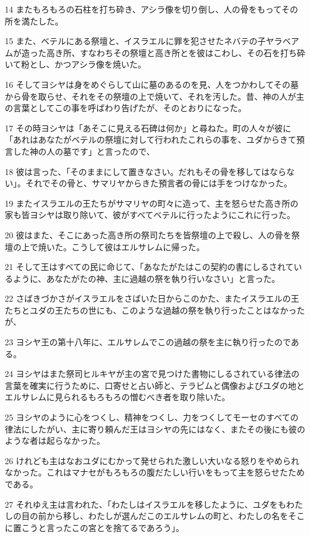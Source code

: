 \par 14 またもろもろの石柱を打ち砕き、アシラ像を切り倒し、人の骨をもってその所を満たした。
\par 15 また、ベテルにある祭壇と、イスラエルに罪を犯させたネバテの子ヤラベアムが造った高き所、すなわちその祭壇と高き所とを彼はこわし、その石を打ち砕いて粉とし、かつアシラ像を焼いた。
\par 16 そしてヨシヤは身をめぐらして山に墓のあるのを見、人をつかわしてその墓から骨を取らせ、それをその祭壇の上で焼いて、それを汚した。昔、神の人が主の言葉としてこの事を呼ばわり告げたが、そのとおりになった。
\par 17 その時ヨシヤは「あそこに見える石碑は何か」と尋ねた。町の人々が彼に「あれはあなたがベテルの祭壇に対して行われたこれらの事を、ユダからきて預言した神の人の墓です」と言ったので、
\par 18 彼は言った、「そのままにして置きなさい。だれもその骨を移してはならない」。それでその骨と、サマリヤからきた預言者の骨には手をつけなかった。
\par 19 またイスラエルの王たちがサマリヤの町々に造って、主を怒らせた高き所の家も皆ヨシヤは取り除いて、彼がすべてベテルに行ったようにこれに行った。
\par 20 彼はまた、そこにあった高き所の祭司たちを皆祭壇の上で殺し、人の骨を祭壇の上で焼いた。こうして彼はエルサレムに帰った。
\par 21 そして王はすべての民に命じて、「あなたがたはこの契約の書にしるされているように、あなたがたの神、主に過越の祭を執り行いなさい」と言った。
\par 22 さばきづかさがイスラエルをさばいた日からこのかた、またイスラエルの王たちとユダの王たちの世にも、このような過越の祭を執り行ったことはなかったが、
\par 23 ヨシヤ王の第十八年に、エルサレムでこの過越の祭を主に執り行ったのである。
\par 24 ヨシヤはまた祭司ヒルキヤが主の宮で見つけた書物にしるされている律法の言葉を確実に行うために、口寄せと占い師と、テラピムと偶像およびユダの地とエルサレムに見られるもろもろの憎むべき者を取り除いた。
\par 25 ヨシヤのように心をつくし、精神をつくし、力をつくしてモーセのすべての律法にしたがい、主に寄り頼んだ王はヨシヤの先にはなく、またその後にも彼のような者は起らなかった。
\par 26 けれども主はなおユダにむかって発せられた激しい大いなる怒りをやめられなかった。これはマナセがもろもろの腹だたしい行いをもって主を怒らせたためである。
\par 27 それゆえ主は言われた、「わたしはイスラエルを移したように、ユダをもわたしの目の前から移し、わたしが選んだこのエルサレムの町と、わたしの名をそこに置こうと言ったこの宮とを捨てるであろう」。
